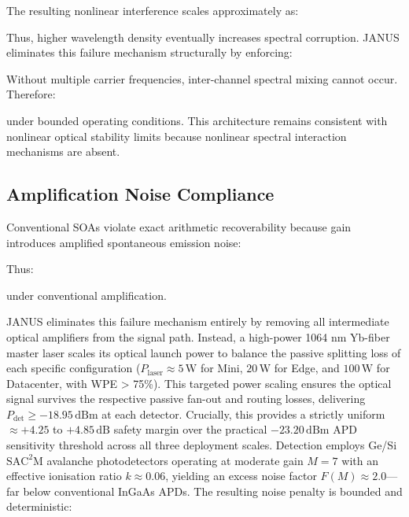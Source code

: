 \documentclass[journal]{IEEEtran}
\begin{document}
The resulting nonlinear interference scales approximately as:

\begin{center}
\end{center}

Thus, higher wavelength density eventually increases spectral corruption. JANUS eliminates this failure mechanism structurally by enforcing:
\begin{center}
\end{center}

Without multiple carrier frequencies, inter-channel spectral mixing cannot occur.
Therefore:

\begin{center}
\end{center}

under bounded operating conditions. This architecture remains consistent with nonlinear optical stability limits because nonlinear spectral interaction mechanisms are absent.

\subsection{\textbf{Amplification Noise Compliance}}

Conventional SOAs violate exact arithmetic recoverability because gain introduces amplified spontaneous emission noise:

\begin{center}
\end{center}

Thus:
\begin{center}
\end{center}

under conventional amplification.

JANUS eliminates this failure mechanism entirely by removing all intermediate optical amplifiers from the signal path. Instead, a high-power 1064 nm Yb-fiber master laser scales its optical launch power to balance the passive splitting loss of each specific configuration ($P_{\text{laser}} \approx 5\,\text{W}$ for Mini, $20\,\text{W}$ for Edge, and $100\,\text{W}$ for Datacenter, with WPE > 75\%). This targeted power scaling ensures the optical signal survives the respective passive fan-out and routing losses, delivering $P_{\text{det}} \ge -18.95\,\text{dBm}$ at each detector. Crucially, this provides a strictly uniform $\approx +4.25$ to $+4.85\,\text{dB}$ safety margin over the practical $-23.20\,\text{dBm}$ APD sensitivity threshold across all three deployment scales. Detection employs Ge/Si $\mathrm{SAC^2M}$ avalanche photodetectors operating at moderate gain $M = 7$ with an effective ionisation ratio $k \approx 0.06$, yielding an excess noise factor $F(M) \approx 2.0$---far below conventional InGaAs APDs. The resulting noise penalty is bounded and deterministic:
\end{document}
